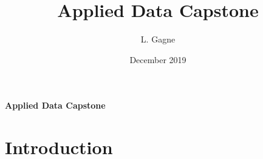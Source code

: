 \documentclass{article}
\title{Applied Data Capstone}
\author{L. Gagne}
\date{December 2019}
\begin{document}
\maketitle
\textbf{Applied Data Capstone}
\section{Introduction}
\end{document}
